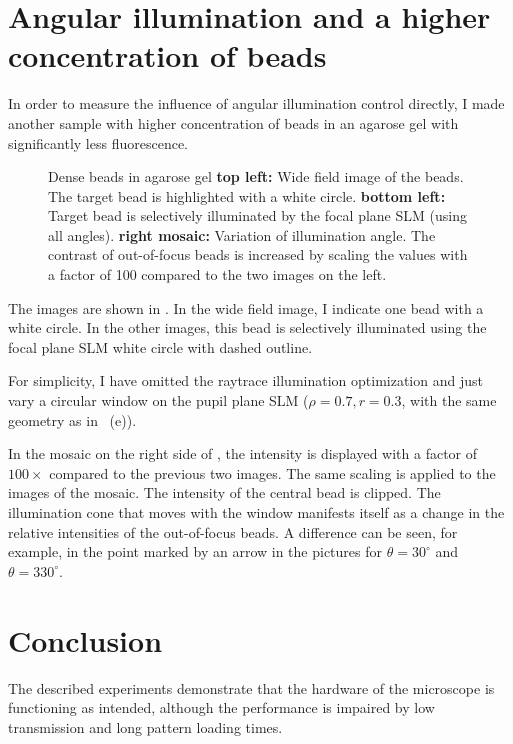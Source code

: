 \section{Angular illumination and a higher concentration of beads}
In order to measure the influence of angular illumination control
directly, I made another sample with higher concentration of beads in
an agarose gel with significantly less fluorescence.


\begin{figure}[!hbt]
  \centering
  \caption{Dense beads in agarose gel {\bf top left:} Wide field image
    of the beads. The target bead is highlighted with a white circle.
    {\bf bottom left:} Target bead is selectively illuminated by the
    focal plane SLM (using all angles).  {\bf right mosaic:} Variation
    of illumination angle. The contrast of out-of-focus beads is
    increased by scaling the values with a factor of 100 compared to
    the two images on the left.}
  \label{fig:montage-ang}
\end{figure}

The images are shown in . In the wide field
image, I indicate one bead with a white circle. In the other images,
this bead is selectively illuminated using the focal plane SLM white
circle with dashed outline.

For simplicity, I have omitted the raytrace illumination optimization
and just vary a circular window on the pupil plane SLM ($\rho=0.7,
r=0.3$, with the same geometry as in ~(e)).


In the mosaic on the right side of , the
intensity is displayed with a factor of $100\times$ compared to the
previous two images. The same scaling is applied to the images of the
mosaic. The intensity of the central bead is clipped. The illumination
cone that moves with the window manifests itself as a change in the
relative intensities of the out-of-focus beads. A difference can be
seen, for example, in the point marked by an arrow in the pictures for
$\theta=30^\circ$ and $\theta=330^\circ$.

\section{Conclusion}
The described experiments demonstrate that the hardware of the
microscope is functioning as intended, although the performance is
impaired by low transmission and long pattern loading times.


